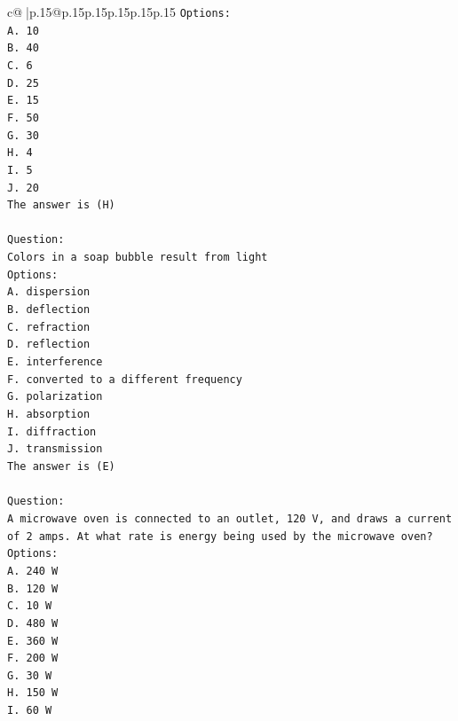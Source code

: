 \documentclass{article}
\begin{document}
{\begin{supertabular}{c@{$\;$}|p{.15\linewidth}@{}p{.15\linewidth}p{.15\linewidth}p{.15\linewidth}p{.15\linewidth}p{.15\linewidth}}
{{{\texttt{Options:} \\
\texttt{A. 10} \\
\texttt{B. 40} \\
\texttt{C. 6} \\
\texttt{D. 25} \\
\texttt{E. 15} \\
\texttt{F. 50} \\
\texttt{G. 30} \\
\texttt{H. 4} \\
\texttt{I. 5} \\
\texttt{J. 20} \\
\texttt{The answer is (H)} \\
\\ 
\texttt{Question:} \\
\texttt{Colors in a soap bubble result from light} \\
\texttt{Options:} \\
\texttt{A. dispersion} \\
\texttt{B. deflection} \\
\texttt{C. refraction} \\
\texttt{D. reflection} \\
\texttt{E. interference} \\
\texttt{F. converted to a different frequency} \\
\texttt{G. polarization} \\
\texttt{H. absorption} \\
\texttt{I. diffraction} \\
\texttt{J. transmission} \\
\texttt{The answer is (E)} \\
\\ 
\texttt{Question:} \\
\texttt{A microwave oven is connected to an outlet, 120 V, and draws a current of 2 amps. At what rate is energy being used by the microwave oven?} \\
\texttt{Options:} \\
\texttt{A. 240 W} \\
\texttt{B. 120 W} \\
\texttt{C. 10 W} \\
\texttt{D. 480 W} \\
\texttt{E. 360 W} \\
\texttt{F. 200 W} \\
\texttt{G. 30 W} \\
\texttt{H. 150 W} \\
\texttt{I. 60 W} \\
}}}
\end{supertabular}}
\end{document}

